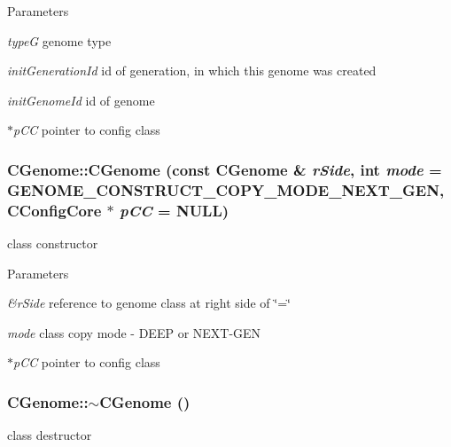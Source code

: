 \begin{DoxyParams}{Parameters}
\item[{\em typeG}]genome type \item[{\em initGenerationId}]id of generation, in which this genome was created \item[{\em initGenomeId}]id of genome \item[{\em $\ast$pCC}]pointer to config class \end{DoxyParams}
\hypertarget{classCGenome_afe7e2e3d4f8d7640c72a3a392147b08a}{
\subsubsection[{CGenome}]{\setlength{\rightskip}{0pt plus 5cm}CGenome::CGenome (const {\bf CGenome} \& {\em rSide}, \/  int {\em mode} = {\ttfamily GENOME\_\-CONSTRUCT\_\-COPY\_\-MODE\_\-NEXT\_\-GEN}, \/  {\bf CConfigCore} $\ast$ {\em pCC} = {\ttfamily NULL})}}
\label{classCGenome_afe7e2e3d4f8d7640c72a3a392147b08a}
class constructor


\begin{DoxyParams}{Parameters}
\item[{\em \&rSide}]reference to genome class at right side of \char`\"{}=\char`\"{} \item[{\em mode}]class copy mode -\/ DEEP or NEXT-\/GEN \item[{\em $\ast$pCC}]pointer to config class \end{DoxyParams}
\hypertarget{classCGenome_a6ed12f20c2ca1f53498046b584acb01b}{
\subsubsection[{$\sim$CGenome}]{\setlength{\rightskip}{0pt plus 5cm}CGenome::$\sim$CGenome ()}}
\label{classCGenome_a6ed12f20c2ca1f53498046b584acb01b}
class destructor 


